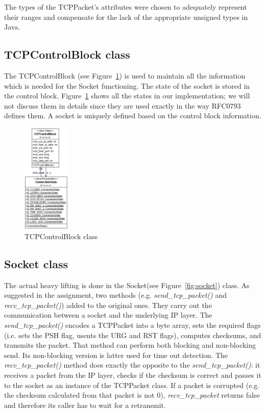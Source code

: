 \documentclass{article}
\begin{document}
\noindent
The types of the TCPPacket's attributes were chosen to adequately represent their ranges and compensate
for the lack of the appropriate unsigned types in Java.
  
\subsection{TCPControlBlock class}
The TCPControlBlock (see Figure~\ref{fig:tcb}) is used to maintain all the information which is needed
for the Socket functioning. The state of the socket is stored in the control block. Figure~\ref{fig:tcb}
shows all the states in our implementation; we will not discuss them in details since they are used
exactly in the way RFC0793 defines them. A socket is uniquely defined based on the control block information.


\begin{figure}[h!]
\centering
\includegraphics[width=0.2\textwidth]{images/control_block}
\caption{TCPControlBlock class}
\label{fig:tcb}
\end{figure}
  
\subsection{Socket class}
The actual heavy lifting is done in the Socket(see Figure~\ref{fig:socket}) class. As suggested in the assignment, two methods 
(e.g. \textit{send\_tcp\_packet()} and \textit{recv\_tcp\_packet()}) added to the original ones. They carry out the communication
between a socket and the underlying IP layer. The \textit{send\_tcp\_packet()} encodes a TCPPacket into a byte array,
sets the required flags (i.e. sets the PSH flag, usents the URG and RST flags), computes checksums, and transmits the
packet. That method can perform both blocking and non-blocking send. Its non-blocking version is latter 
used for time out detection. The \textit{recv\_tcp\_packet()} method does exactly the opposite to the \textit{send\_tcp\_packet()}:
it receives a packet from the IP layer, checks if the checksum is correct and passes it to the socket
as an instance of the TCPPacket class. If a packet is corrupted (e.g. the checksum calculated from that packet is not 0),
\textit{recv\_tcp\_packet} returns false and therefore its caller has to wait for a retransmit.
\end{document}
